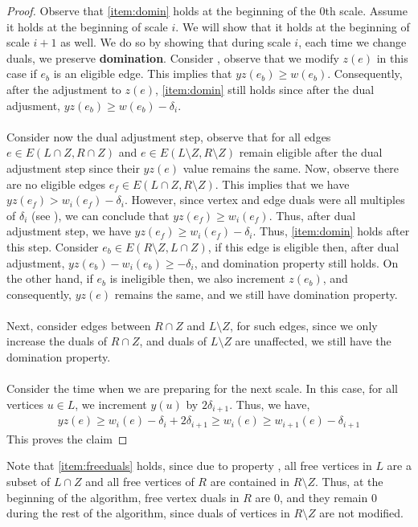 \begin{proof}
Observe that \ref{item:domin} holds at the beginning of the $0$th scale. Assume it holds at the beginning of scale $i$. We will show that it holds at the beginning of scale $i+1$ as well. We do so by showing that during scale $i$, each time we change duals, we preserve \textbf{domination}. Consider , observe that we modify $z(e)$ in this case if $e_b$ is an eligible edge. This implies that $yz(e_b)\geqslant w(e_b)$. Consequently, after the adjustment to $z(e)$, \ref{item:domin} still holds since after the dual adjusment, $yz(e_b)\geqslant w(e_b)-\delta_i$. \\ \\
Consider now the dual adjustment step, observe that for all edges $e\in E(L\cap Z,R\cap Z)$ and $e\in E(L\setminus Z, R\setminus Z)$ remain eligible after the dual adjustment step since their $yz(e)$ value remains the same. Now, observe there are no eligible edges $e_f\in E(L\cap Z, R\setminus Z)$. This implies that we have $yz(e_f)>  w_i(e_f)-\delta_i$. However, since vertex and edge duals were all multiples of $\delta_i$ (see ), we can conclude that $yz(e_f)\geqslant w_i(e_f)$. Thus, after dual adjustment step, we have $yz(e_f)\geqslant w_i(e_f)-\delta_i$. Thus, \ref{item:domin} holds after this step. Consider $e_b\in E(R\setminus Z, L\cap Z)$, if this edge is eligible then, after dual adjustment, $yz(e_b)-w_i(e_b)\geqslant -\delta_i$, and domination property still holds. On the other hand, if $e_b$ is ineligible then, we also increment $z(e_b)$, and consequently, $yz(e)$ remains the same, and we still have domination property. \\ \\
Next, consider edges between $R\cap Z$ and $L\setminus Z$, for such edges, since we only increase the duals of $R\cap Z$, and duals of $L\setminus Z$ are unaffected, we still have the domination property. \\ \\
Consider the time when we are preparing for the next scale. In this case, for all vertices $u\in L$, we increment $y(u)$ by $2\delta_{i+1}$. Thus, we have,
\begin{align*}
yz(e)\geqslant w_{i}(e)-\delta_i+2\delta_{i+1}\geqslant w_{i}(e) \geqslant w_{i+1}(e)-\delta_{i+1}
\end{align*}
This proves the claim
\end{proof}
\begin{observation2}
Note that \ref{item:freeduals} holds, since due to property , all free vertices in $L$ are a subset of $L\cap Z$ and all free vertices of $R$ are contained in $R\setminus Z$. Thus, at the beginning of the algorithm, free vertex duals in $R$ are $0$, and they remain $0$ during the rest of the algorithm, since duals of vertices in $R\setminus Z$ are not modified.
\end{observation2}

